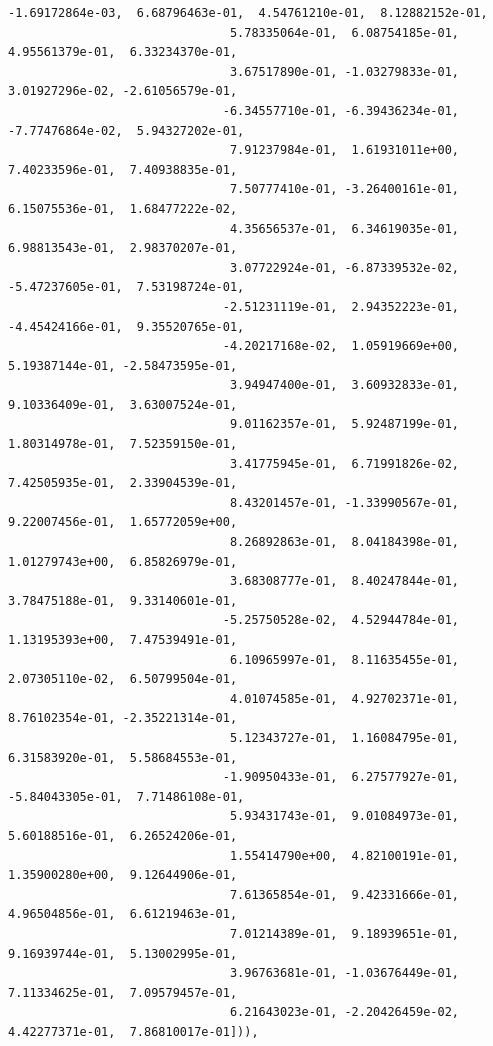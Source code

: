 \documentclass[11pt]{article}
\begin{document}
\begin{Verbatim}[commandchars=\\\{\}]
                              -1.69172864e-03,  6.68796463e-01,  4.54761210e-01,  8.12882152e-01,
                               5.78335064e-01,  6.08754185e-01,  4.95561379e-01,  6.33234370e-01,
                               3.67517890e-01, -1.03279833e-01,  3.01927296e-02, -2.61056579e-01,
                              -6.34557710e-01, -6.39436234e-01, -7.77476864e-02,  5.94327202e-01,
                               7.91237984e-01,  1.61931011e+00,  7.40233596e-01,  7.40938835e-01,
                               7.50777410e-01, -3.26400161e-01,  6.15075536e-01,  1.68477222e-02,
                               4.35656537e-01,  6.34619035e-01,  6.98813543e-01,  2.98370207e-01,
                               3.07722924e-01, -6.87339532e-02, -5.47237605e-01,  7.53198724e-01,
                              -2.51231119e-01,  2.94352223e-01, -4.45424166e-01,  9.35520765e-01,
                              -4.20217168e-02,  1.05919669e+00,  5.19387144e-01, -2.58473595e-01,
                               3.94947400e-01,  3.60932833e-01,  9.10336409e-01,  3.63007524e-01,
                               9.01162357e-01,  5.92487199e-01,  1.80314978e-01,  7.52359150e-01,
                               3.41775945e-01,  6.71991826e-02,  7.42505935e-01,  2.33904539e-01,
                               8.43201457e-01, -1.33990567e-01,  9.22007456e-01,  1.65772059e+00,
                               8.26892863e-01,  8.04184398e-01,  1.01279743e+00,  6.85826979e-01,
                               3.68308777e-01,  8.40247844e-01,  3.78475188e-01,  9.33140601e-01,
                              -5.25750528e-02,  4.52944784e-01,  1.13195393e+00,  7.47539491e-01,
                               6.10965997e-01,  8.11635455e-01,  2.07305110e-02,  6.50799504e-01,
                               4.01074585e-01,  4.92702371e-01,  8.76102354e-01, -2.35221314e-01,
                               5.12343727e-01,  1.16084795e-01,  6.31583920e-01,  5.58684553e-01,
                              -1.90950433e-01,  6.27577927e-01, -5.84043305e-01,  7.71486108e-01,
                               5.93431743e-01,  9.01084973e-01,  5.60188516e-01,  6.26524206e-01,
                               1.55414790e+00,  4.82100191e-01,  1.35900280e+00,  9.12644906e-01,
                               7.61365854e-01,  9.42331666e-01,  4.96504856e-01,  6.61219463e-01,
                               7.01214389e-01,  9.18939651e-01,  9.16939744e-01,  5.13002995e-01,
                               3.96763681e-01, -1.03676449e-01,  7.11334625e-01,  7.09579457e-01,
                               6.21643023e-01, -2.20426459e-02,  4.42277371e-01,  7.86810017e-01])),

\end{Verbatim}
\end{document}
